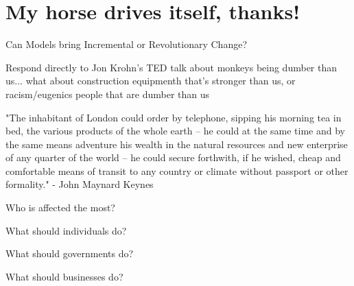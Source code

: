 \setchapterpreamble[u]{\margintoc}
\chapter{My horse drives itself, thanks!}


Can Models bring Incremental or Revolutionary Change?

Respond directly to Jon Krohn's TED talk about monkeys being dumber than us... what about construction equipmenth that's stronger than us, or racism/eugenics people that are dumber than us 

"The inhabitant of London could order by telephone, sipping his morning tea in bed, the various products of the whole earth -- he could at the same time and by the same means adventure his wealth in the natural resources and new enterprise of any quarter of the world -- he could secure forthwith, if he wished, cheap and comfortable means of transit to any country or climate without passport or other formality." - John Maynard Keynes 

Who is affected the most?

What should individuals do?

What should governments do?

What should businesses do?
